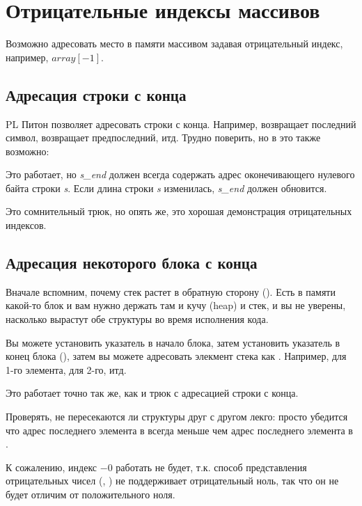 \section{Отрицательные индексы массивов}
\label{negative_array_indices}

Возможно адресовать место в памяти  массивом задавая отрицательный индекс, например, $array[-1]$.

\subsection{Адресация строки с конца}

\ac{PL} Питон позволяет адресовать строки с конца.
Например,  возвращает последний символ,  возвращает предпоследний, итд.
Трудно поверить, но в \CCpp это также возможно:



Это работает, но \textit{s\_end} должен всегда содержать адрес оконечивающего нулевого байта строки \textit{s}.
Если длина строки \textit{s} изменилась, \textit{s\_end} должен обновится.

Это сомнительный трюк, но опять же, это хорошая демонстрация отрицательных индексов.

\subsection{Адресация некоторого блока с конца}

Вначале вспомним, почему стек растет в обратную сторону ().
Есть в памяти какой-то блок и вам нужно держать там и кучу (heap) и стек, и вы не уверены, насколько вырастут обе
структуры во время исполнения кода.

Вы можете установить указатель  в начало блока,
затем установить указатель  в конец блока (),
затем вы можете адресовать  элекмент стека как .
Например,  для 1-го элемента,  для 2-го, итд.

Это работает точно так же, как и трюк с адресацией строки с конца.

Проверять, не пересекаются ли структуры друг с другом лекго:
просто убедится что адрес последнего элемента в  всегда меньше чем адрес последнего элемента в .

К сожалению, индекс $-0$ работать не будет,
т.к. способ представления отрицательных чисел (, )
не поддерживает отрицательный ноль,
так что он не будет отличим от положительного ноля.

